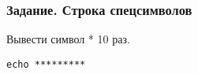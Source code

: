 \begin{frame}[fragile]
	\frametitle{Задание. Строка спецсимволов}
Вывести символ * 10 раз.
				\begin{lstlisting}
echo *********
				\end{lstlisting}
\end{frame}
